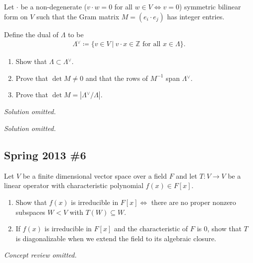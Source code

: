 Let \(\cdot\) be a non-degenerate (\(v \cdot w = 0\) for all
\(w \in V \iff v = 0\)) symmetric bilinear form on \(V\) such that the
Gram matrix \(M = (e_i \cdot e_j )\) has integer entries.

Define the dual of \(\Lambda\) to be
\begin{align*}
\Lambda  {}^{ \vee }\coloneqq\{v \in V {~\mathrel{\Big\vert}~}v \cdot x \in {\mathbb{Z}}\text{ for all } x \in \Lambda
\}
.\end{align*}

\begin{enumerate}
\def\labelenumi{\alph{enumi}.}
\item
  Show that \(\Lambda \subset \Lambda {}^{ \vee }\).
\item
  Prove that \(\operatorname{det}M \neq 0\) and that the rows of
  \(M^{-1}\) span \(\Lambda {}^{ \vee }\).
\item
  Prove that \(\operatorname{det}M = |\Lambda {}^{ \vee }/\Lambda|\).
\end{enumerate}


\emph{Solution omitted.}

\emph{Solution omitted.}

\hypertarget{spring-2013-6}{%
\subsection{Spring 2013 \#6}\label{spring-2013-6}}

Let \(V\) be a finite dimensional vector space over a field \(F\) and
let \(T: V\to V\) be a linear operator with characteristic polynomial
\(f(x) \in F[x]\).

\begin{enumerate}
\def\labelenumi{\alph{enumi}.}
\item
  Show that \(f(x)\) is irreducible in \(F[x] \iff\) there are no proper
  nonzero subspaces \(W< V\) with \(T(W) \subseteq W\).
\item
  If \(f(x)\) is irreducible in \(F[x]\) and the characteristic of \(F\)
  is 0, show that \(T\) is diagonalizable when we extend the field to
  its algebraic closure.
\end{enumerate}


\emph{Concept review omitted.}

